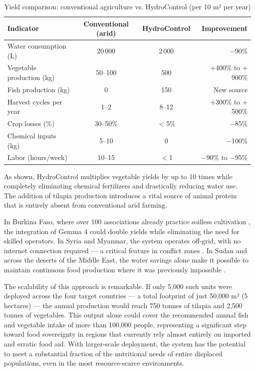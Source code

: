 \documentclass[12pt,a4paper]{article}
\begin{document}
\begin{table}[H]
\centering
\caption{Yield comparison: conventional agriculture vs. HydroControl (per 10 m² per year)}
\label{tab:yield_gain}
\begin{tabular}{@{}lccr@{}}
\toprule
\textbf{Indicator} & \textbf{Conventional (arid)} & \textbf{HydroControl} & \textbf{Improvement} \\
\midrule
Water consumption (L)      & 20\,000       & 2\,000         & $-$90\% \\
Vegetable production (kg)  & 50--100       & 500            & $+$400\% to $+$900\% \\
Fish production (kg)       & 0             & 150            & New source \\
Harvest cycles per year    & 1--2          & 8--12          & $+$300\% to $+$500\% \\
Crop losses (\%)           & 30--50\%      & $<$5\%         & $-$85\% \\
Chemical inputs (kg)       & 5--10         & 0              & $-$100\% \\
Labor (hours/week)         & 10--15        & $<$1           & $-$90\% to $-$95\% \\
\bottomrule
\end{tabular}
\end{table}

As shown, HydroControl multiplies vegetable yields by up to 10 times while completely eliminating chemical fertilizers and drastically reducing water use. The addition of tilapia production introduces a vital source of animal protein that is entirely absent from conventional arid farming.

In Burkina Faso, where over 100 associations already practice soilless cultivation \cite{burkina2023}, the integration of Gemma 4 could double yields while eliminating the need for skilled operators. In Syria and Myanmar, the system operates off-grid, with no internet connection required — a critical feature in conflict zones \cite{watan2025,myanmar2025}. In Sudan and across the deserts of the Middle East, the water savings alone make it possible to maintain continuous food production where it was previously impossible \cite{wfp2019}.

The scalability of this approach is remarkable. If only 5,000 such units were deployed across the four target countries — a total footprint of just 50,000 m² (5 hectares) — the annual production would reach 750 tonnes of tilapia and 2,500 tonnes of vegetables. This output alone could cover the recommended annual fish and vegetable intake of more than 100,000 people, representing a significant step toward food sovereignty in regions that currently rely almost entirely on imported and erratic food aid. With larger-scale deployment, the system has the potential to meet a substantial fraction of the nutritional needs of entire displaced populations, even in the most resource-scarce environments.
\end{document}
